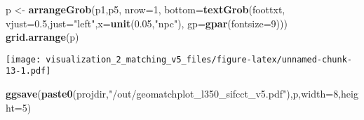 \documentclass[
]{article}
\newenvironment{Shaded}{\begin{snugshade}}{\end{snugshade}}
\newcommand{\DataTypeTok}[1]{\textcolor[rgb]{0.13,0.29,0.53}{#1}}
\newcommand{\DecValTok}[1]{\textcolor[rgb]{0.00,0.00,0.81}{#1}}
\newcommand{\FloatTok}[1]{\textcolor[rgb]{0.00,0.00,0.81}{#1}}
\newcommand{\KeywordTok}[1]{\textcolor[rgb]{0.13,0.29,0.53}{\textbf{#1}}}
\newcommand{\NormalTok}[1]{#1}
\newcommand{\StringTok}[1]{\textcolor[rgb]{0.31,0.60,0.02}{#1}}
\begin{document}
\begin{Shaded}
\begin{Highlighting}[]
\NormalTok{p <-}\StringTok{ }\KeywordTok{arrangeGrob}\NormalTok{(p1,p5, }\DataTypeTok{nrow=}\DecValTok{1}\NormalTok{,}
                 \DataTypeTok{bottom=}\KeywordTok{textGrob}\NormalTok{(foottxt, }\DataTypeTok{vjust=}\FloatTok{0.5}\NormalTok{,}\DataTypeTok{just=}\StringTok{"left"}\NormalTok{,}\DataTypeTok{x=}\KeywordTok{unit}\NormalTok{(}\FloatTok{0.05}\NormalTok{,}\StringTok{"npc"}\NormalTok{),}
                                 \DataTypeTok{gp=}\KeywordTok{gpar}\NormalTok{(}\DataTypeTok{fontsize=}\DecValTok{9}\NormalTok{)))}
\KeywordTok{grid.arrange}\NormalTok{(p)}
\end{Highlighting}
\end{Shaded}

\texttt{[image: visualization\_2\_matching\_v5\_files/figure-latex/unnamed-chunk-13-1.pdf]}

\begin{Shaded}
\begin{Highlighting}[]
\KeywordTok{ggsave}\NormalTok{(}\KeywordTok{paste0}\NormalTok{(projdir,}\StringTok{"/out/geomatchplot_l350_sifcct_v5.pdf"}\NormalTok{),p,}\DataTypeTok{width=}\DecValTok{8}\NormalTok{,}\DataTypeTok{height=}\DecValTok{5}\NormalTok{)}
\end{Highlighting}
\end{Shaded}
\end{document}
